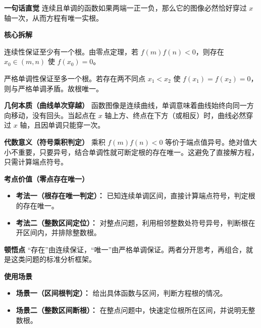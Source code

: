 \begin{explanationbox}
	\textbf{\textcolor{CExplanation}{一句话直觉}}
	连续且单调的函数如果两端一正一负，那么它的图像必然恰好穿过 $x$ 轴一次，从而方程有唯一实根。

	\medskip
	\textbf{\textcolor{CExplanation}{核心拆解}}
	\begin{description}[style=nextline, leftmargin=2.8em, labelsep=0.5em, itemsep=0.45em]
		\item[\textbf{要点一（零点存在定理）：}]
			连续性保证至少有一个根。由零点定理，若 $f(m)f(n)<0$，则存在 $x_0\in(m,n)$ 使 $f(x_0)=0$。
		\item[\textbf{要点二（唯一性保证）：}]
			严格单调性保证至多一个根。若存在两不同点 $x_1<x_2$ 使 $f(x_1)=f(x_2)=0$，则与严格单调矛盾。故根唯一。
	\end{description}

	\medskip
	\textbf{\textcolor{CExplanation}{几何本质（曲线单次穿越）}}
	函数图像是连续曲线，单调意味着曲线始终向同一方向移动，没有回头。当起点在 $x$ 轴上方、终点在下方（或相反）时，曲线必然穿过 $x$ 轴，且因单调只能穿一次。

	\medskip
	\textbf{\textcolor{CExplanation}{代数意义（符号乘积判定）}}
	乘积 $f(m)f(n)<0$ 等价于端点值异号。绝对值大小不重要，只要异号，结合单调性就可断定根的存在唯一。这避免了直接解方程，只需计算端点符号。

	\medskip
	\textbf{\textcolor{CExplanation}{考点价值（零点存在唯一）}}
	\begin{itemize}[leftmargin=*, itemsep=0.5em, topsep=0.4em]
		\item \textbf{考法一（根存在唯一判定）：} 已知连续单调区间，直接计算端点符号，判定根的存在唯一。
		\item \textbf{考法二（整数区间定位）：} 对整点问题，利用相邻整数处符号异号，判断根在开区间内，并排除整数根。
	\end{itemize}

	\medskip
	\textbf{\textcolor{CExplanation}{顿悟点}}
	“存在”由连续保证，“唯一”由严格单调保证。两者分开思考，再组合，就是这类问题的标准分析框架。

	\medskip
	\textbf{\textcolor{CExplanation}{使用场景}}
	\begin{itemize}[leftmargin=*, itemsep=0.5em, topsep=0.4em]
		\item \textbf{场景一（区间根判定）：} 给出具体函数与区间，判断方程根的情况。
		\item \textbf{场景二（整数区间断根）：} 在整点问题中，快速定位根所在区间，并说明无整数根。
	\end{itemize}

\end{explanationbox}
